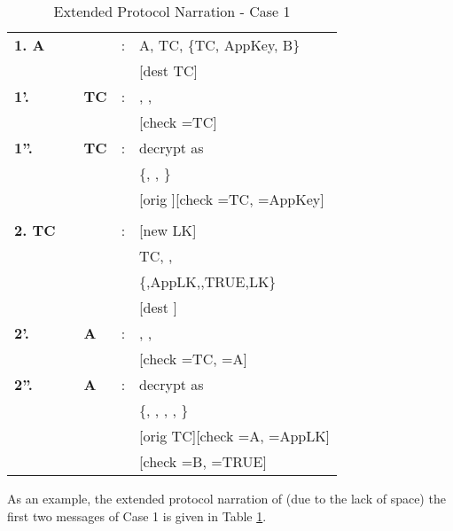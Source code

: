 \begin{table}\renewcommand{\arraystretch}{1.3}
\renewcommand{\tabcolsep}{0.02cm} \caption{Extended Protocol Narration - Case 1}
\label{tab:xpn}
\begin{tabular}{lllll}
\hline
\textbf{1. A} &\textbf{} &\textbf{ } &:& A, TC, \{TC, AppKey, B\} \\
               &                           &            & & [\textnormal{dest TC}] \\
\textbf{1'. } &\textbf{} &\textbf{TC}&:& , ,  \\
               &                           &            & & [\textnormal{check } =TC]\\
\textbf{1''.} &                           &\textbf{TC}&:& \textnormal{decrypt  as }\\
               &                           &            & & \{, , \}\\
               &                           &            & & [\textnormal{orig }][\textnormal{check } =TC, =AppKey]\\
               &                           &            & & \\
\textbf{2. TC}&\textbf{} &            &: & [\textnormal{new} LK]\\
               &                           &            && TC, , \\
               &                           &            && \{,AppLK,,TRUE,LK\} \\
               &                           &            && [\textnormal{dest }] \\
\textbf{2'. } &\textbf{} &\textbf{A} &:& , ,  \\
               &                           &            & & [\textnormal{check } =TC, =A]\\
\textbf{2''.} &                           &\textbf{A} &:& \textnormal{decrypt  as }   \\
               &                           &            & & \{, , , , \}\\
               &                           &            & & [\textnormal{orig TC}][\textnormal{check } =A, =AppLK]\\
               &                           &            & & [\textnormal{check } =B, =TRUE] \\
\hline
\end{tabular}
\end{table}
As an example, the extended protocol narration of (due to the lack of space) the first two messages of Case 1 is given in Table \ref{tab:xpn}. 
